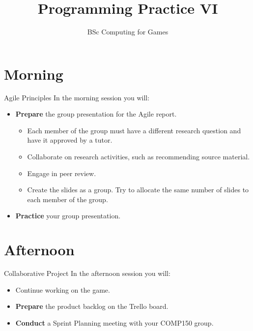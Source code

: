 \documentclass[xcolor={dvipsnames}]{beamer}\usepackage{etoolbox}\newtoggle{printable}\togglefalse{printable}
\begin{document}
\title{Programming Practice VI}   
\subtitle{BSc Computing for Games}

\frame{\titlepage} 

\part{Morning}
\frame{\partpage}

\begin{frame}{Agile Principles}
	In the morning session you will:
	
	\begin{itemize}
		\item \textbf{Prepare} the group presentation for the Agile report.
		\begin{itemize}
			\item Each member of the group must have a different research question and have it approved by a tutor.
			\item Collaborate on research activities, such as recommending source material.
			\item Engage in peer review.
			\item Create the slides as a group. Try to allocate the same number of slides to each member of the group.
		\end{itemize}
		\item \textbf{Practice} your group presentation.
	\end{itemize}
\end{frame}

\part{Afternoon}
\frame{\partpage}

\begin{frame}{Collaborative Project}
	In the afternoon session you will:
	
	\begin{itemize}
		\item Continue working on the game.
		\item \textbf{Prepare} the product backlog on the Trello board.
		\item \textbf{Conduct} a Sprint Planning meeting with your COMP150 group.
	\end{itemize}
\end{frame}


%
\end{document}
